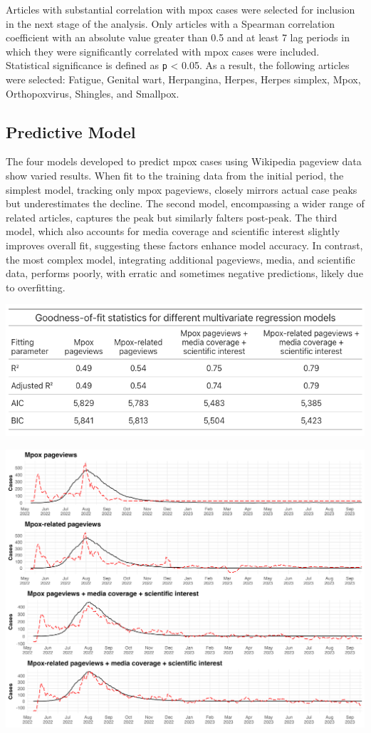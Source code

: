 \documentclass[
  12pt,
]{article}
\begin{document}
Articles with substantial correlation with mpox cases were selected for
inclusion in the next stage of the analysis. Only articles with a
Spearman correlation coefficient with an absolute value greater than 0.5
and at least 7 lag periods in which they were significantly correlated
with mpox cases were included. Statistical significance is defined as
\texttt{p} \textless{} 0.05. As a result, the following articles were
selected: Fatigue, Genital wart, Herpangina, Herpes, Herpes simplex,
Mpox, Orthopoxvirus, Shingles, and Smallpox.~

\subsection{Predictive Model}\label{predictive-model-1}

The four models developed to predict mpox cases using Wikipedia pageview
data show varied results. When fit to the training data from the initial
period, the simplest model, tracking only mpox pageviews, closely
mirrors actual case peaks but underestimates the decline. The second
model, encompassing a wider range of related articles, captures the peak
but similarly falters post-peak. The third model, which also accounts
for media coverage and scientific interest slightly improves overall
fit, suggesting these factors enhance model accuracy. In contrast, the
most complex model, integrating additional pageviews, media, and
scientific data, performs poorly, with erratic and sometimes negative
predictions, likely due to overfitting.~

\includegraphics{images/Bildschirmfoto 2024-04-29 um 22.58.42.png}

\includegraphics{images/regression-analysis-model-fit-train.png}
\end{document}
